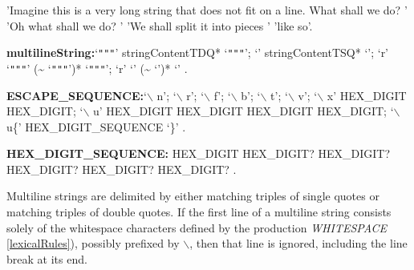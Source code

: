 \documentclass{article}
\newcommand{\code}[1]{{\sf #1}}
\begin{document}




\begin{dartCode}
'Imagine this is a very long string that does not fit on a line. What shall we do? '
'Oh what shall we do? '
'We shall split it into pieces '
'like so'.
\end{dartCode}





\begin{grammar}
  {\bf multilineString:}`{\escapegrammar \texttt{"""}}' stringContentTDQ* `{\escapegrammar \texttt{"""}}';
    `{\escapegrammar \code{'}\code{'}\code{'}}' stringContentTSQ* `{\escapegrammar \code{'}\code{'}\code{'}}';
    `r' `{\escapegrammar \texttt{"""}}' (\~{} `{\escapegrammar \texttt{"""}}')* `{\escapegrammar \texttt{"""}}';
    `r' `{\escapegrammar \code{'}\code{'}\code{'}}' (\~{} `{\escapegrammar \code{'}\code{'}\code{'}}')* `{\escapegrammar \code{'}\code{'}\code{'}}'
  .


  {\bf ESCAPE\_SEQUENCE:}`$\backslash$ n';
    `$\backslash$ r';
    `$\backslash$ f';
    `$\backslash$ b';
    `$\backslash$ t';
    `$\backslash$ v';
    `$\backslash$ x' HEX\_DIGIT HEX\_DIGIT;
    `$\backslash$ u' HEX\_DIGIT HEX\_DIGIT HEX\_DIGIT HEX\_DIGIT;
    `$\backslash$ u\{' HEX\_DIGIT\_SEQUENCE `\}'
  .

{\bf HEX\_DIGIT\_SEQUENCE:}
     HEX\_DIGIT HEX\_DIGIT? HEX\_DIGIT? HEX\_DIGIT? HEX\_DIGIT? HEX\_DIGIT?
    .

\end{grammar}

\LMHash{}
Multiline strings are delimited by either matching triples of single quotes or matching triples of double quotes. If the first line of a multiline string consists solely of the whitespace characters defined by the production {\em WHITESPACE} \ref{lexicalRules}), possibly prefixed by $\backslash$, then that line is ignored, including the line break at its end.

\end{document}

